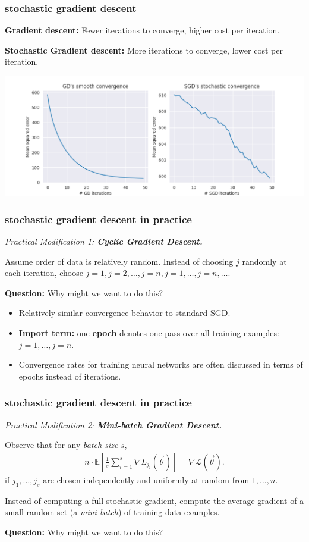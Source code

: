 \documentclass[handout,compress]{beamer}
\newcommand{\E}{\mathbb{E}}
\begin{document}
\begin{frame}
	\frametitle{stochastic gradient descent}
	\textbf{Gradient descent:} Fewer iterations to converge, higher cost per iteration.
	
	\textbf{Stochastic Gradient descent:} More iterations to converge, lower cost per iteration.
	
	\begin{center}
		\includegraphics[width=.9\textwidth]{gd_convergence.png}
	\end{center}
\end{frame}

\begin{frame}
	\frametitle{stochastic gradient descent in practice}
	\emph{Practical Modification 1: \textbf{Cyclic Gradient Descent.}}
	
	Assume order of data is relatively random. Instead of choosing $j$ randomly at each iteration, choose $j = 1, j = 2, \ldots, j = n, j= 1, \ldots, j=n, \ldots$.  
	
	\textbf{Question:} Why might we want to do this?
	
\vspace{4em}
\begin{itemize}
	\item Relatively similar convergence behavior to standard SGD. 
	\item \textbf{Import term:} one \alert{\textbf{epoch}} denotes one pass over all training examples: $j= 1, \ldots, j=n$. 
	\item Convergence rates for training neural networks are often discussed in terms of epochs instead of iterations. 
\end{itemize}
\end{frame}

\begin{frame}
	\frametitle{stochastic gradient descent in practice}
	\emph{Practical Modification 2: \textbf{Mini-batch Gradient Descent.}}
	
	Observe that for any \emph{batch size} $s$,
	\begin{align*}
	n\cdot\E\left[\frac{1}{s}\sum_{i=1}^s\nabla L_{j_i}(\vec{\theta}) \right] = \nabla \mathcal{L}(\vec{\theta}).
	\end{align*}
	if $j_1, \ldots, j_s$ are chosen independently and uniformly at random from $1, \ldots, n$.
	
	Instead of computing a full stochastic gradient, compute the average gradient of a small random set (a \emph{mini-batch}) of training data examples. 
	
	\textbf{Question:} Why might we want to do this?
		
\end{frame}
\end{document}
